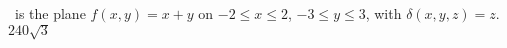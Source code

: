 {\surfaceS\ is the plane $f(x,y)=x+y$ on $-2\leq x\leq 2$, $-3\leq y\leq 3$, with $\delta(x,y,z) = z$.
}
{$240\sqrt{3}$
}
